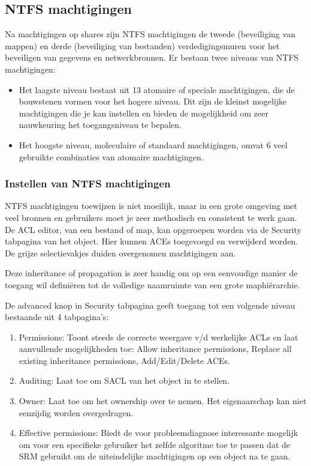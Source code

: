 \subsection{NTFS machtigingen}

Na machtigingen op shares zijn NTFS machtigingen de tweede (beveiliging van
mappen) en derde (beveiliging van bestanden) verdedigingsmuren voor het
beveiligen van gegevens en netwerkbronnen. Er bestaan twee niveaus van NTFS
machtigingen:
\begin{itemize}
	\item Het laagste niveau bestaat uit 13 atomaire of speciale
		machtigingen, die de bouwstenen vormen voor het hogere niveau.
		Dit zijn de kleinst mogelijke machtigingen die je kan instellen 
		en bieden de mogelijkheid om zeer nauwkeuring het toegangsniveau te
		bepalen.
	\item Het hoogste niveau, moleculaire of standaard machtigingen, omvat 6
		veel gebruikte combinaties van atomaire machtigingen.
\end{itemize}

\subsubsection{Instellen van NTFS machtigingen}

NTFS machtigingen toewijzen is niet moeilijk, maar in een grote omgeving met
veel bronnen en gebruikers moet je zeer methodisch en consistent te werk gaan.
De ACL editor, van een bestand of map, kan opgeroepen worden via de Security
tabpagina van het object. Hier kunnen ACEs toegevoegd en verwijderd worden. De
grijze selectievakjes duiden overgenomen machtigingen aan.

Deze inheritance of propagation is zeer handig om op een eenvoudige manier de
toegang wil definiëren tot de volledige naamruimte van een grote maphiërarchie.

De advanced knop in Security tabpagina geeft toegang tot een volgende niveau
bestaande uit 4 tabpagina's:
\begin{enumerate}
	\item Permissions: Toont steeds de correcte weergave v/d werkelijke
		ACLs en laat aanvullende mogelijkheden toe: Allow inheritance
		permissions, Replace all existing inheritance permissions,
		Add/Edit/Delete ACEs.
	\item Auditing: Laat toe om SACL van het object in te stellen.
	\item Owner: Laat toe om het ownership over te nemen. Het eigenaarschap
		kan niet eenzijdig worden overgedragen.
	\item Effective permissions: Biedt de voor probleemdiagnose interessante 
		mogelijk om voor een specifieke gebruiker het zelfde algoritme toe te 
		passen dat de SRM gebruikt om de uiteindelijke machtigingen op een 
		object na te gaan.
\end{enumerate}

